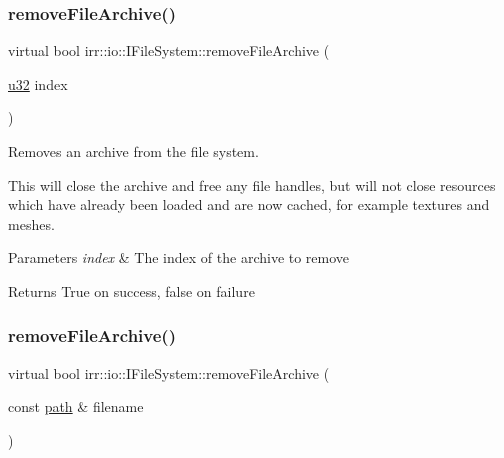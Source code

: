 \subsubsection{\texorpdfstring{remove\+File\+Archive()}{removeFileArchive()}\hspace{0.1cm}{\footnotesize\ttfamily [1/3]}}
{\footnotesize\ttfamily virtual bool irr\+::io\+::\+I\+File\+System\+::remove\+File\+Archive (\begin{DoxyParamCaption}\item[{\hyperlink{namespaceirr_a0416a53257075833e7002efd0a18e804}{u32}}]{index }\end{DoxyParamCaption})\hspace{0.3cm}{\ttfamily [pure virtual]}}



Removes an archive from the file system. 

This will close the archive and free any file handles, but will not close resources which have already been loaded and are now cached, for example textures and meshes. 
\begin{DoxyParams}{Parameters}
{\em index} & The index of the archive to remove \\
\hline
\end{DoxyParams}
\begin{DoxyReturn}{Returns}
True on success, false on failure 
\end{DoxyReturn}
\mbox{\label{classirr_1_1io_1_1IFileSystem_a03b405c8f5346c225c590cde585eb73c}} 
\subsubsection{\texorpdfstring{remove\+File\+Archive()}{removeFileArchive()}\hspace{0.1cm}{\footnotesize\ttfamily [2/3]}}
{\footnotesize\ttfamily virtual bool irr\+::io\+::\+I\+File\+System\+::remove\+File\+Archive (\begin{DoxyParamCaption}\item[{const \hyperlink{namespaceirr_1_1io_ab1bdc45edb3f94d8319c02bc0f840ee1}{path} \&}]{filename }\end{DoxyParamCaption})\hspace{0.3cm}{\ttfamily [pure virtual]}}



